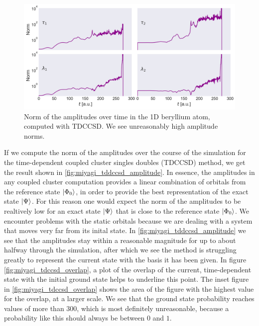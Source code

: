 \begin{figure}
    \centering
    \includegraphics[width=\textwidth]{results/figures/miyagi/amplitude_norm_tdccsd.png} 
    \caption{Norm of the amplitudes over time in the 1D beryllium atom, computed 
        with TDCCSD. We see unreasonably high amplitude norms.
    }
    \label{fig:miyagi_tddccsd_amplitude}
\end{figure}

If we compute the norm of the amplitudes over the course of the simulation for 
the time-dependent coupled cluster singles doubles (TDCCSD) method, we get the 
result shown in \autoref{fig:miyagi_tddccsd_amplitude}. In essence, the amplitudes 
in any coupled cluster computation provides a linear combination of orbitals 
from the reference state $\ket{\Phi_0}$, in order to provide the best representation of the 
exact state $\ket{\Psi}$. For this reason one would expect the norm of the 
amplitudes to be realtively low for an exact state $\ket{\Psi}$ that is close to the
reference state $\ket{\Phi_0}$.
We encounter problems with the static orbitals because we are dealing with a system that
moves very far 
from its inital state. In \autoref{fig:miyagi_tddccsd_amplitude} we see
that the amplitudes stay within a reasonable magnitude for up to about halfway through 
the simulation, after which we see the method is struggling greatly to 
represent the current state with the basis it has been given. In figure 
\autoref{fig:miyagi_tdccsd_overlap}, a plot of the 
overlap of the current, time-dependent state with the initial ground state
helps to underline this point. The inset figure in \autoref{fig:miyagi_tdccsd_overlap}
shows the area of the figure with the highest value for the overlap, at a larger scale.
We see that the ground state probability reaches values of more than $300$, which is 
most definitely unreasonable, because a probability like this should always be between 
$0$ and $1$.

